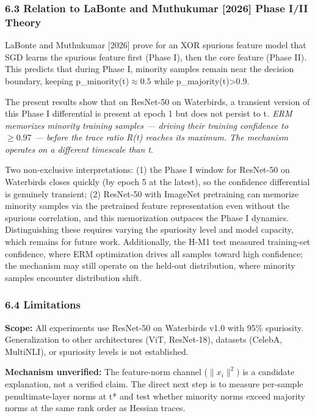 \subsubsection{6.3 Relation to LaBonte and Muthukumar [2026] Phase I/II Theory}

LaBonte and Muthukumar [2026] prove for an XOR spurious feature model that SGD learns the spurious feature first (Phase I), then the core feature (Phase II). This predicts that during Phase I, minority samples remain near the decision boundary, keeping p\_minority(t)$\approx 0.5$ while p\_majority(t)>0.9.

The present results show that on ResNet-50 on Waterbirds, a transient version of this Phase I differential is present at epoch 1 but does not persist to t\textit{. ERM memorizes minority training samples --- driving their training confidence to $\geq 0.97$ --- before the trace ratio R(t) reaches its maximum. The mechanism operates on a different timescale than t}.

Two non-exclusive interpretations: (1) the Phase I window for ResNet-50 on Waterbirds closes quickly (by epoch 5 at the latest), so the confidence differential is genuinely transient; (2) ResNet-50 with ImageNet pretraining can memorize minority samples via the pretrained feature representation even without the spurious correlation, and this memorization outpaces the Phase I dynamics. Distinguishing these requires varying the spuriosity level and model capacity, which remains for future work. Additionally, the H-M1 test measured training-set confidence, where ERM optimization drives all samples toward high confidence; the mechanism may still operate on the held-out distribution, where minority samples encounter distribution shift.

\subsubsection{6.4 Limitations}

\textbf{Scope:} All experiments use ResNet-50 on Waterbirds v1.0 with 95\% spuriosity. Generalization to other architectures (ViT, ResNet-18), datasets (CelebA, MultiNLI), or spuriosity levels is not established.

\textbf{Mechanism unverified:} The feature-norm channel ($\|x_{i}\|^{2})$ is a candidate explanation, not a verified claim. The direct next step is to measure per-sample penultimate-layer norms at t* and test whether minority norms exceed majority norms at the same rank order as Hessian traces.


